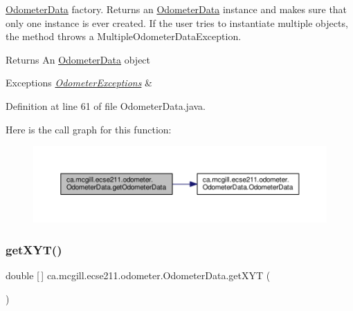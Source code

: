 \hyperlink{classca_1_1mcgill_1_1ecse211_1_1odometer_1_1_odometer_data}{Odometer\+Data} factory. Returns an \hyperlink{classca_1_1mcgill_1_1ecse211_1_1odometer_1_1_odometer_data}{Odometer\+Data} instance and makes sure that only one instance is ever created. If the user tries to instantiate multiple objects, the method throws a Multiple\+Odometer\+Data\+Exception.

\begin{DoxyReturn}{Returns}
An \hyperlink{classca_1_1mcgill_1_1ecse211_1_1odometer_1_1_odometer_data}{Odometer\+Data} object 
\end{DoxyReturn}

\begin{DoxyExceptions}{Exceptions}
{\em \hyperlink{classca_1_1mcgill_1_1ecse211_1_1odometer_1_1_odometer_exceptions}{Odometer\+Exceptions}} & \\
\hline
\end{DoxyExceptions}


Definition at line 61 of file Odometer\+Data.\+java.

Here is the call graph for this function\+:\nopagebreak
\begin{figure}[H]
\begin{center}
\leavevmode
\includegraphics[width=350pt]{classca_1_1mcgill_1_1ecse211_1_1odometer_1_1_odometer_data_afff2d760dd1f861b580f3eacef37f1cc_cgraph}
\end{center}
\end{figure}
\mbox{\label{classca_1_1mcgill_1_1ecse211_1_1odometer_1_1_odometer_data_a8f40f0264c68f0cbed4fff1723ae7863}} 
\subsubsection{\texorpdfstring{get\+X\+Y\+T()}{getXYT()}}
{\footnotesize\ttfamily double \mbox{[}$\,$\mbox{]} ca.\+mcgill.\+ecse211.\+odometer.\+Odometer\+Data.\+get\+X\+YT (\begin{DoxyParamCaption}{ }\end{DoxyParamCaption})}

